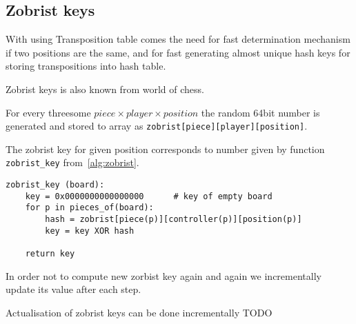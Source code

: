 	\subsection{Zobrist keys}
	With using Transposition table comes the need for fast determination
	mechanism if two positions are the same, and for fast generating almost
	unique hash keys for storing transpositions into hash table.
	
	Zobrist keys is also known from world of chess.

	For every threesome $piece\times player\times position$ the random 64bit
	number is generated and stored to array as
	\texttt{zobrist[piece][player][position]}.

	The zobrist key for given position corresponds to number given by function \texttt{zobrist\_key} from~\ref{alg:zobrist}.

	\lstset{language=Python, caption=Computing zobrist key, label=alg:zobrist}
	\begin{lstlisting}
zobrist_key (board):
    key = 0x0000000000000000      # key of empty board
    for p in pieces_of(board):
        hash = zobrist[piece(p)][controller(p)][position(p)]
        key = key XOR hash

    return key
	\end{lstlisting}

	In order not to compute new zorbist key again and again we
	incrementally update its value after each step.

	Actualisation of zobrist keys can be done incrementally \cite{COX} TODO

% 
% 

